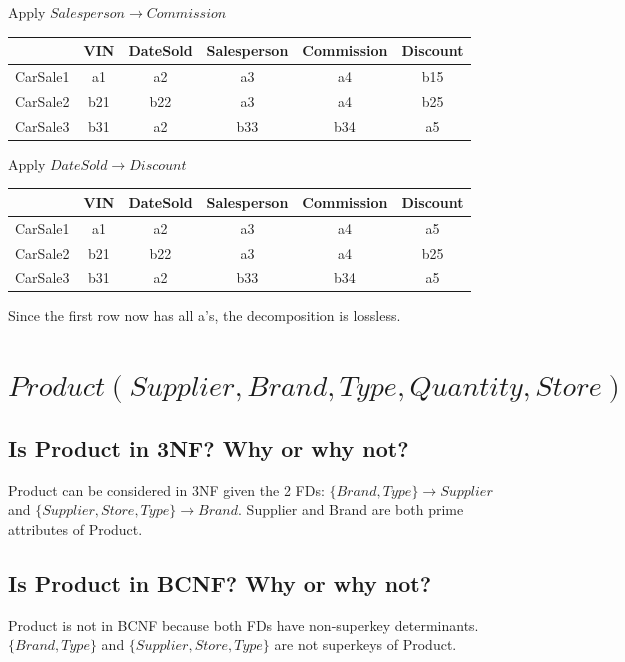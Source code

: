 \documentclass{article}
\begin{document}
\begin{table}[H]{Apply $Salesperson \rightarrow Commission$}
\begin{tabular}{|c|c|c|c|c|c|}
    \hline
    & VIN & DateSold & Salesperson & Commission & Discount \\
    \hline
    CarSale1 & a1 & a2 & a3 & a4 & b15 \\
    \hline
    CarSale2 & b21 & b22 & a3 & a4 & b25 \\
    \hline
    CarSale3 & b31 & a2 & b33 & b34 & a5 \\
    \hline
    \end{tabular}
\end{table}

\begin{table}[H]{Apply $DateSold \rightarrow Discount$}
\begin{tabular}{|c|c|c|c|c|c|}
    \hline
    & VIN & DateSold & Salesperson & Commission & Discount \\
    \hline
    CarSale1 & a1 & a2 & a3 & a4 & a5 \\
    \hline
    CarSale2 & b21 & b22 & a3 & a4 & b25 \\
    \hline
    CarSale3 & b31 & a2 & b33 & b34 & a5 \\
    \hline
    \end{tabular}
\end{table}
Since the first row now has all a's, the decomposition is lossless.

\section {$Product(Supplier, Brand, Type, Quantity, Store)$}
\subsection{Is Product in 3NF? Why or why not?}
Product can be considered in 3NF given the 2 FDs: $\{Brand, Type\} \rightarrow Supplier$ and $\{Supplier, Store, Type\} \rightarrow Brand$.
Supplier and Brand are both prime attributes of Product.
\subsection{Is Product in BCNF? Why or why not?}
Product is not in BCNF because both FDs have non-superkey determinants. 
$\{Brand, Type\}$ and $\{Supplier, Store, Type\}$ are not superkeys of Product.
\end{document}
